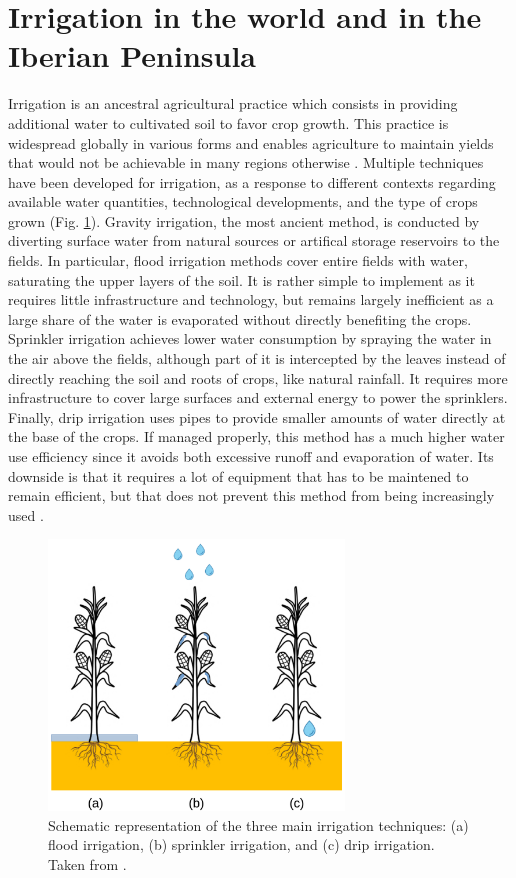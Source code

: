 \section{Irrigation in the world and in the Iberian Peninsula}
\label{sec:irrig_context}
Irrigation is an ancestral agricultural practice which consists in providing additional water to cultivated soil to favor crop growth.
This practice is widespread globally in various forms and enables agriculture to maintain yields that would not be achievable in many regions otherwise \citep{siebert_quantifying_2010}.
Multiple techniques have been developed for irrigation, as a response to different contexts regarding available water quantities, technological developments, and the type of crops grown (Fig. \ref{fig:irrig_methods}).
Gravity irrigation, the most ancient method, is conducted by diverting surface water from natural sources or artifical storage reservoirs to the fields. In particular, flood irrigation methods cover entire fields with water, saturating the upper layers of the soil. It is rather simple to implement as it requires little infrastructure and technology, but remains largely inefficient as a large share of the water is evaporated without directly benefiting the crops.
Sprinkler irrigation achieves lower water consumption by spraying the water in the air above the fields, although part of it is intercepted by the leaves instead of directly reaching the soil and roots of crops, like natural rainfall. It requires more infrastructure to cover large surfaces and external energy to power the sprinklers.
Finally, drip irrigation uses pipes to provide smaller amounts of water directly at the base of the crops. If managed properly, this method has a much higher water use efficiency since it avoids both excessive runoff and evaporation of water. Its downside is that it requires a lot of equipment that has to be maintened to remain efficient, but that does not prevent this method from being increasingly used \citep{mpanga_decade_2021, pool_flood_2021}.

\begin{figure}[hbtp]
    \centering
    \includegraphics[width=0.7\textwidth]{images/intro/irrigation_methods_lunel.png}
    \caption{Schematic representation of the three main irrigation techniques: (a) flood irrigation, (b) sprinkler irrigation, and (c) drip irrigation. Taken from \citet{lunel_interactions_2024}.}
    \label{fig:irrig_methods}
\end{figure}

